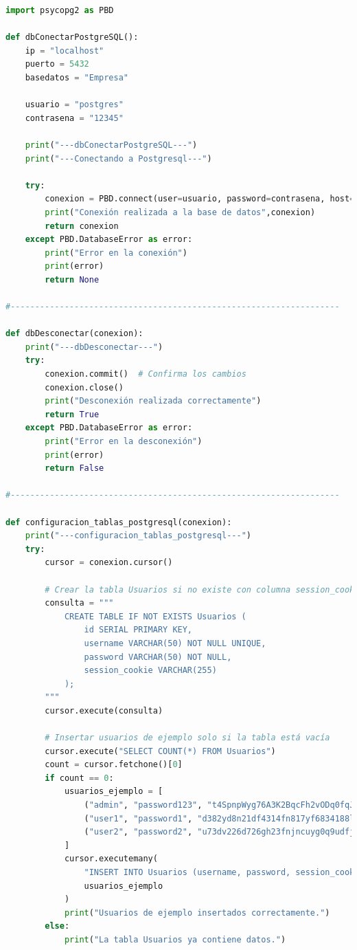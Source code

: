 \documentclass[a4paper,12pt]{article}
\begin{document}
\begin{lstlisting}[language=Python]
    import psycopg2 as PBD

def dbConectarPostgreSQL():
    ip = "localhost"
    puerto = 5432
    basedatos = "Empresa"

    usuario = "postgres"
    contrasena = "12345"

    print("---dbConectarPostgreSQL---")
    print("---Conectando a Postgresql---")

    try:
        conexion = PBD.connect(user=usuario, password=contrasena, host=ip, port=puerto, database=basedatos)
        print("Conexión realizada a la base de datos",conexion)
        return conexion
    except PBD.DatabaseError as error:
        print("Error en la conexión")
        print(error)
        return None

#-------------------------------------------------------------------

def dbDesconectar(conexion):
    print("---dbDesconectar---")
    try:
        conexion.commit()  # Confirma los cambios
        conexion.close()
        print("Desconexión realizada correctamente")
        return True
    except PBD.DatabaseError as error:
        print("Error en la desconexión")
        print(error)
        return False

#-------------------------------------------------------------------

def configuracion_tablas_postgresql(conexion):
    print("---configuracion_tablas_postgresql---")
    try:
        cursor = conexion.cursor()

        # Crear la tabla Usuarios si no existe con columna session_cookie
        consulta = """
            CREATE TABLE IF NOT EXISTS Usuarios (
                id SERIAL PRIMARY KEY,
                username VARCHAR(50) NOT NULL UNIQUE,
                password VARCHAR(50) NOT NULL,
                session_cookie VARCHAR(255)
            );
        """
        cursor.execute(consulta)

        # Insertar usuarios de ejemplo solo si la tabla está vacía
        cursor.execute("SELECT COUNT(*) FROM Usuarios")
        count = cursor.fetchone()[0]
        if count == 0:
            usuarios_ejemplo = [
                ("admin", "password123", "t4SpnpWyg76A3K2BqcFh2vODq0fqJGvs38ydh9"),
                ("user1", "password1", "d382yd8n21df4314fn817yf6834188ls023d8d"),
                ("user2", "password2", "u73dv226d726gh23fnjncuyg0q9udfjf47eueu")
            ]
            cursor.executemany(
                "INSERT INTO Usuarios (username, password, session_cookie) VALUES (%s, %s, %s)",
                usuarios_ejemplo
            )
            print("Usuarios de ejemplo insertados correctamente.")
        else:
            print("La tabla Usuarios ya contiene datos.")


\end{lstlisting}
\end{document}
